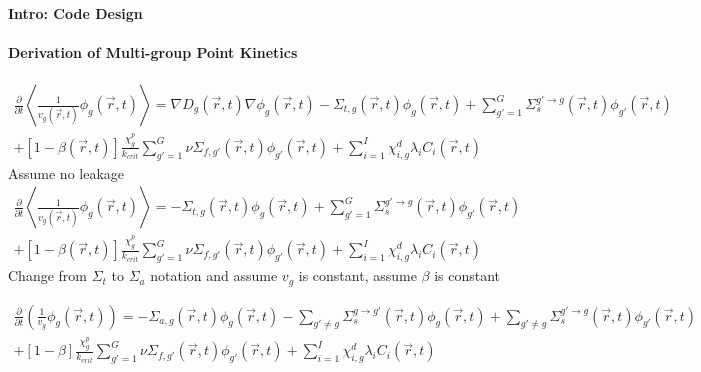 \documentclass[12pt]{report}
\begin{document}
	
	
	\maketitle
	
	\paragraph{Intro: Code Design}
	\paragraph{Derivation of Multi-group Point Kinetics}

	\begin{eqnarray}
	\frac{\partial}{\partial t} \left\langle \frac{1}{v_g(\vec{r},t)} \phi_g(\vec{r},t) \right\rangle = \nabla D_g(\vec{r},t) \nabla \phi_g(\vec{r},t) - \Sigma_{t,g}(\vec{r},t) \phi_g(\vec{r},t) + \sum_{g'=1}^{G} \Sigma_{s}^{g'\rightarrow g} (\vec{r},t) \phi_{g'}(\vec{r},t) \nonumber \\ 
	+ \left[ 1- \beta(\vec{r},t) \right] \frac{\chi_g^p}{k_{crit}} \sum_{g'=1}^{G} \nu \Sigma_{f,g'}(\vec{r},t) \phi_{g'}(\vec{r},t) + \sum_{i=1}^{I} \chi_{i,g}^d \lambda_i C_i(\vec{r},t) \nonumber
	\end{eqnarray}
	Assume no leakage
		\begin{eqnarray}
		\frac{\partial}{\partial t} \left\langle \frac{1}{v_g(\vec{r},t)} \phi_g(\vec{r},t) \right\rangle = - \Sigma_{t,g}(\vec{r},t) \phi_g(\vec{r},t) + \sum_{g'=1}^{G} \Sigma_{s}^{g'\rightarrow g} (\vec{r},t) \phi_{g'}(\vec{r},t) \nonumber \\ 
		+ \left[ 1- \beta(\vec{r},t) \right] \frac{\chi_g^p}{k_{crit}} \sum_{g'=1}^{G} \nu \Sigma_{f,g'}(\vec{r},t) \phi_{g'}(\vec{r},t) + \sum_{i=1}^{I} \chi_{i,g}^d \lambda_i C_i(\vec{r},t) \nonumber
		\end{eqnarray}
	Change from $\Sigma_t$ to $\Sigma_a$ notation and assume $v_g$ is constant, assume $\beta$ is constant
	
	\begin{eqnarray}
	\frac{\partial}{\partial t} \left( \frac{1}{v_g} \phi_g(\vec{r},t) \right) = - \Sigma_{a,g}(\vec{r},t) \phi_g(\vec{r},t) - \sum_{g'\neq g} \Sigma_{s}^{g\rightarrow g'} (\vec{r},t) \phi_{g}(\vec{r},t) + \sum_{g' \neq g} \Sigma_{s}^{g'\rightarrow g} (\vec{r},t) \phi_{g'}(\vec{r},t) \nonumber \\ 
	+ \left[ 1- \beta \right] \frac{\chi_g^p}{k_{crit}} \sum_{g'=1}^{G} \nu \Sigma_{f,g'}(\vec{r},t) \phi_{g'}(\vec{r},t) + \sum_{i=1}^{I} \chi_{i,g}^d \lambda_i C_i(\vec{r},t) \nonumber
	\end{eqnarray}
	
\end{document}
